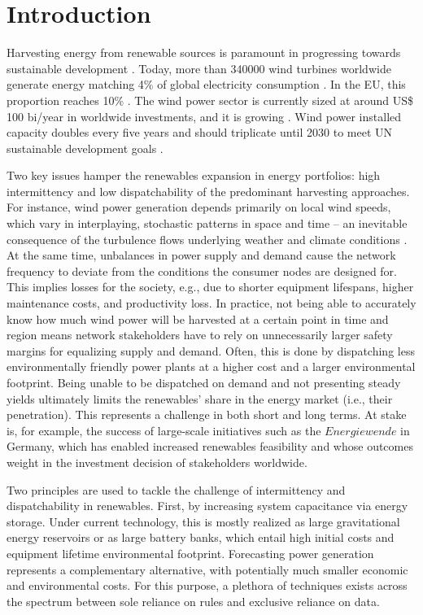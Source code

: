 \chapter{Introduction}
Harvesting energy from renewable sources is paramount in progressing towards sustainable development \cite{johansson2002energy}.
Today, more than 340000 wind turbines worldwide generate energy matching 4\% of global electricity consumption \cite{gwec2017numbers}.
In the EU, this proportion reaches 10\% \cite{gwec2017numbers}.
The wind power sector is currently sized at around US\$ 100 bi/year in worldwide investments, and it is growing \cite{update2017global}.
Wind power installed capacity doubles every five years and should triplicate until 2030 to meet UN sustainable development goals \cite{gwec2017numbers}.

Two key issues hamper the renewables expansion in energy portfolios: high intermittency and low dispatchability of the predominant harvesting approaches.
For instance, wind power generation depends primarily on local wind speeds, which vary in interplaying, stochastic patterns in space and time – an inevitable consequence of the turbulence flows underlying weather and climate conditions \cite{pope2001turbulent}.
At the same time, unbalances in power supply and demand cause the network frequency to deviate from the conditions the consumer nodes are designed for.
This implies losses for the society, e.g., due to shorter equipment lifespans, higher maintenance costs, and productivity loss.
In practice, not being able to accurately know how much wind power will be harvested at a certain point in time and region means network stakeholders have to rely on unnecessarily larger safety margins for equalizing supply and demand.
Often, this is done by dispatching less environmentally friendly power plants at a higher cost and a larger environmental footprint.
Being unable to be dispatched on demand and not presenting steady yields ultimately limits the renewables' share in the energy market (i.e., their penetration).
This represents a challenge in both short and long terms.
At stake is, for example, the success of large-scale initiatives such as the $\textit{Energiewende}$ in Germany, which has enabled increased renewables feasibility and whose outcomes weight in the investment decision of stakeholders worldwide.

Two principles are used to tackle the challenge of intermittency and dispatchability in renewables.
First, by increasing system capacitance via energy storage.
Under current technology, this is mostly realized as large gravitational energy reservoirs or as large battery banks, which entail high initial costs and equipment lifetime environmental footprint.
Forecasting power generation represents a complementary alternative, with potentially much smaller economic and environmental costs.
For this purpose, a plethora of techniques exists across the spectrum between sole reliance on rules and exclusive reliance on data.


